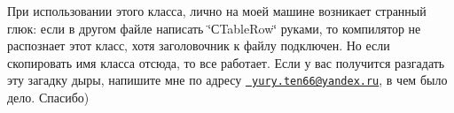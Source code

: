
\begin{DoxyRefList}
\item[Класс \mbox{\hyperlink{class_xD0_xA1_table_row}{С\+Table\+Row}} ]\label{bug__bug000001}%
%
 При использовании этого класса, лично на моей машине возникает странный глюк\+: если в другом файле написать \char`\"{}С\+Table\+Row\char`\"{} руками, то компилятор не распознает этот класс, хотя заголовочник к файлу подключен. Но если скопировать имя класса отсюда, то все работает. Если у вас получится разгадать эту загадку дыры, напишите мне по адресу \href{mailto:yury.ten66@yandex.ru}{\texttt{ yury.\+ten66@yandex.\+ru}}, в чем было дело. Спасибо)
\end{DoxyRefList}